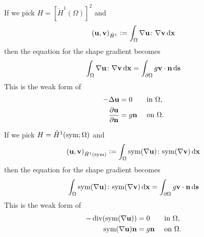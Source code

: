 \documentclass[aspectratio=1610]{beamer}
\begin{document}
\begin{frame}
    \begin{example}
        If we pick $H=[\mathring{H}^1(\Omega)]^2$ and 
            \begin{equation}
                (\mathbf{u}, \mathbf{v})_{\mathring{H}^1} \vcentcolon= \int_{\Omega} \nabla \mathbf{u}\colon \nabla \mathbf{v} \operatorname{d}\!{\mathbf{x}}
            \end{equation}
            then the equation for the shape gradient becomes
            \begin{equation}
                \int_{\Omega} \nabla \mathbf{u}\colon \nabla \mathbf{v} \operatorname{d}\!{\mathbf{x}} = \int_{\partial\Omega} g\mathbf{v}\cdot\mathbf{n}\operatorname{d}\!{\mathbf{s}}
            \end{equation}
            This is the weak form of 
            \begin{equation}
                \begin{aligned}
                    - \Delta \mathbf{u} &= 0 && \text{ in }\Omega,\\
                    \frac{\partial\mathbf{u}}{\partial\mathbf{n}} &= g\mathbf{n} && \text{ on }\Omega.
                \end{aligned}
            \end{equation}
    \end{example}
\end{frame}
\begin{frame}
    \begin{example}
        If we pick $H=\mathring{H}^1(\mathrm{sym}; \Omega)$ and 
            \begin{equation}
                (\mathbf{u}, \mathbf{v})_{\mathring{H}^1(\mathrm{sym})} \vcentcolon= \int_{\Omega} \mathrm{sym}(\nabla \mathbf{u})\colon \mathrm{sym}(\nabla \mathbf{v}) \operatorname{d}\!{\mathbf{x}}
            \end{equation}
            then the equation for the shape gradient becomes
            \begin{equation}
                \int_{\Omega} \mathrm{sym}(\nabla \mathbf{u})\colon \mathrm{sym}(\nabla \mathbf{v}) \operatorname{d}\!{\mathbf{x}} = \int_{\partial\Omega} g\mathbf{v}\cdot\mathbf{n}\operatorname{d}\!{\mathbf{s}}
            \end{equation}
            This is the weak form of 
            \begin{equation}
                \begin{aligned}
                    - \operatorname{div}(\mathrm{sym}(\nabla \mathbf{u})) &= 0 && \text{ in }\Omega,\\
                    \mathrm{sym}(\nabla \mathbf{u}) \mathbf{n} &= g\mathbf{n} && \text{ on }\Omega.
                \end{aligned}
            \end{equation}
    \end{example}
\end{frame}
\end{document}
